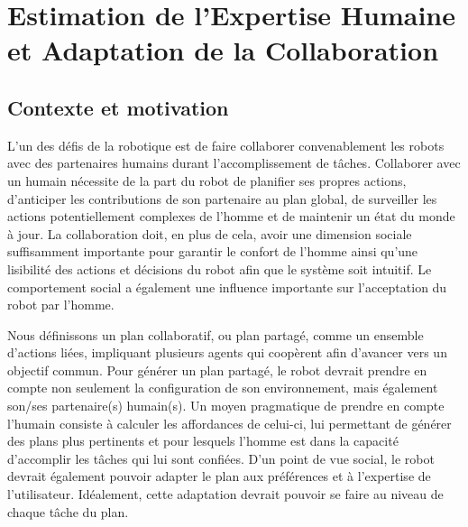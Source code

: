 \documentclass[a4paper,11pt,twoside]{StyleThese}
\begin{document}
\setcounter{chapter}{4} %
\dominitoc
\faketableofcontents
\fi

\chapter{Estimation de l'Expertise Humaine et Adaptation de la Collaboration}
\label{chapter5}
\minitoc

\section{Contexte et motivation}
L'un des défis de la robotique est de faire collaborer convenablement les robots avec des partenaires humains durant l'accomplissement de tâches. Collaborer avec un humain nécessite de la part du robot de planifier ses propres actions, d'anticiper les contributions de son partenaire au plan global, de surveiller les actions potentiellement complexes de l'homme et de maintenir un état du monde à jour. La collaboration doit, en plus de cela, avoir une dimension sociale suffisamment importante pour garantir le confort de l'homme ainsi qu'une lisibilité des actions et décisions du robot afin que le système soit intuitif. Le comportement social a également une influence importante sur l'acceptation du robot par l'homme.

Nous définissons un plan collaboratif, ou plan partagé, comme un ensemble d'actions liées, impliquant plusieurs agents qui coopèrent afin d'avancer vers un objectif commun.
Pour générer un plan partagé, le robot devrait prendre en compte non seulement la configuration de son environnement, mais également son/ses partenaire(s) humain(s). Un moyen pragmatique de prendre en compte l'humain consiste à calculer les affordances de celui-ci, lui permettant de générer des plans plus pertinents et pour lesquels l'homme est dans la capacité d'accomplir les tâches qui lui sont confiées. D'un point de vue social, le robot devrait également pouvoir adapter le plan aux préférences et à l'expertise de l'utilisateur. Idéalement, cette adaptation devrait pouvoir se faire au niveau de chaque tâche du plan.
\end{document}
